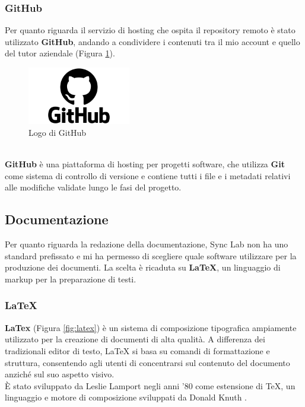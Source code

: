\subsubsection{GitHub}
Per quanto riguarda il servizio di hosting che ospita il \gls{repository}{} remoto è stato utilizzato \textbf{GitHub}, andando a condividere 
i contenuti tra il mio account e quello del tutor aziendale (Figura \ref{fig:github}).\\
\begin{figure}[h]
    \centering
    \includegraphics[width=0.4\textwidth]{images/tecnologie/logo_github.png}
    \caption{Logo di GitHub}
    \label{fig:github}
\end{figure}
\\
\textbf{GitHub} è una piattaforma di hosting per progetti software, che utilizza \textbf{Git} come sistema di controllo di versione e contiene tutti 
i file e i \gls{metadati}{} relativi alle modifiche validate lungo le fasi del progetto.\\
\pagebreak
\subsection{Documentazione}
Per quanto riguarda la redazione della documentazione, Sync Lab non ha uno standard prefissato e mi ha permesso di scegliere quale software utilizzare per la 
produzione dei documenti. La scelta è ricaduta su \textbf{LaTeX}, un linguaggio di markup per la preparazione di testi.\\
\subsubsection{LaTeX}
\textbf{LaTex} (Figura \ref{fig:latex}) è un sistema di composizione tipografica ampiamente utilizzato per la creazione di documenti di alta qualità. A differenza dei tradizionali editor di testo, LaTeX si basa su comandi di formattazione e struttura, consentendo agli utenti di concentrarsi sul contenuto del documento anziché sul suo aspetto visivo.\\
È stato sviluppato da Leslie Lamport negli anni '80 come estensione di TeX, un linguaggio e motore di composizione sviluppati da Donald Knuth \cite{site:History_latex}.

